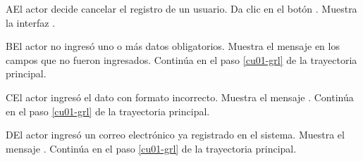 \begin{UCtrayectoriaA}{A}{El actor decide cancelar el registro de un usuario.}
	\UCpaso [\UCactor] Da clic en el botón .
	\UCpaso [\UCsist] Muestra la interfaz .
\end{UCtrayectoriaA} 

\begin{UCtrayectoriaA}{B}{El actor no ingresó uno o más datos obligatorios.}
	\UCpaso [\UCsist] Muestra el mensaje  en los campos que no
	fueron ingresados.
	\UCpaso [\UCsist] Continúa en el paso \ref{cu01-grl} de la trayectoria principal.
\end{UCtrayectoriaA} 

\begin{UCtrayectoriaA}{C}{El actor ingresó el dato con formato incorrecto.}
	\UCpaso [\UCsist] Muestra el mensaje .
	\UCpaso [\UCsist] Continúa en el paso \ref{cu01-grl} de la trayectoria principal.
\end{UCtrayectoriaA} 

\begin{UCtrayectoriaA}{D}{El actor ingresó un correo electrónico ya registrado en el sistema.}
	\UCpaso [\UCsist] Muestra el mensaje .
	\UCpaso [\UCsist] Continúa en el paso \ref{cu01-grl} de la trayectoria principal.
\end{UCtrayectoriaA} 




